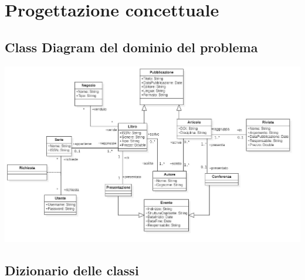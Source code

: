 \chapter{Progettazione concettuale}
    \section{Class Diagram del dominio del problema}

    \includegraphics[scale=0.25, center]{Immagini/CD_dominio_del_problema.png}
        
    \section{Dizionario delle classi}

